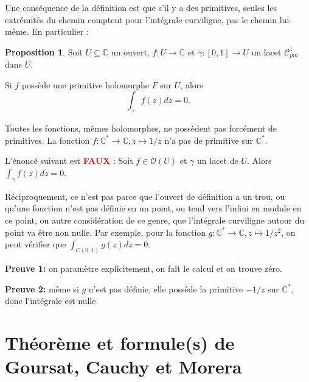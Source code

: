 \documentclass[11pt,a4paper]{article}
\newcommand{\C}{\mathbb{C}}
\theoremstyle{definition}
\newtheorem{proposition}[theoreme]{Proposition}
\theoremstyle{plain}
\begin{document}
Une conséquence de la définition est que s'il y a des primitives, seules les extrémités du chemin comptent pour l'intégrale curviligne, pas le chemin lui-même. En particulier : 

\begin{proposition}
Soit $U\subseteq \C$ un ouvert, $f:U\to\C$  et $\gamma : [0,1]\to U$ un lacet $\mathcal C^1_{pm}$ dans $U$.

Si $f$ possède une primitive holomorphe $F$ sur $U$, alors  
\[\int_\gamma f(z)dz = 0.\]
\end{proposition}

\begin{attention}
Toutes les fonctions, mêmes holomorphes, ne possèdent pas forcément de primitives. La fonction $f : \C^*\to \C, z\mapsto 1/z$ n'a pas de primitive sur $\C^*$.
\end{attention}

\begin{attention}
L'énoncé suivant est \textbf{\textcolor{red}{FAUX}} : \og Soit $f\in \mathcal O(U)$ et $\gamma$ un lacet de $U$. Alors $\int_\gamma f(z)dz = 0$\fg.
\end{attention}

\begin{attention}
Réciproquement, ce n'est pas parce que l'ouvert de définition a un trou, ou qu'une fonction n'est pas définie en un point, ou tend vers l'infini en module en ce point, ou autre considération de ce genre, que l'intégrale curviligne autour du point va être non nulle. Par exemple, pour la fonction $g : \C^*\to\C, z\mapsto 1/z^2$, on peut vérifier que $\int_{C(0,1)}g(z)dz=0$.\par
\textbf{Preuve 1:} on paramètre explicitement, on fait le calcul et on trouve zéro. \par
\textbf{Preuve 2:}  même si $g$ n'est pas définie, elle possède la primitive $-1/z$ sur $\C^*$, donc l'intégrale est nulle.
\end{attention}





\section{Théorème et formule(s) de Goursat, Cauchy et Morera}
\end{document}
